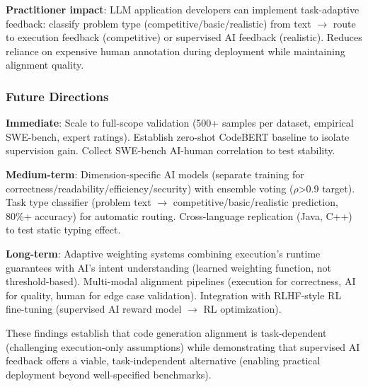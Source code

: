 \textbf{Practitioner impact}: LLM application developers can implement task-adaptive feedback: classify problem type (competitive/basic/realistic) from text $\rightarrow$ route to execution feedback (competitive) or supervised AI feedback (realistic). Reduces reliance on expensive human annotation during deployment while maintaining alignment quality.

\subsubsection{Future Directions}

\textbf{Immediate}: Scale to full-scope validation (500+ samples per dataset, empirical SWE-bench, expert ratings). Establish zero-shot CodeBERT baseline to isolate supervision gain. Collect SWE-bench AI-human correlation to test stability.

\textbf{Medium-term}: Dimension-specific AI models (separate training for correctness/readability/efficiency/security) with ensemble voting ($\rho$>0.9 target). Task type classifier (problem text $\rightarrow$ competitive/basic/realistic prediction, 80\%+ accuracy) for automatic routing. Cross-language replication (Java, C++) to test static typing effect.

\textbf{Long-term}: Adaptive weighting systems combining execution's runtime guarantees with AI's intent understanding (learned weighting function, not threshold-based). Multi-modal alignment pipelines (execution for correctness, AI for quality, human for edge case validation). Integration with RLHF-style RL fine-tuning (supervised AI reward model $\rightarrow$ RL optimization).

These findings establish that code generation alignment is task-dependent (challenging execution-only assumptions) while demonstrating that supervised AI feedback offers a viable, task-independent alternative (enabling practical deployment beyond well-specified benchmarks).
